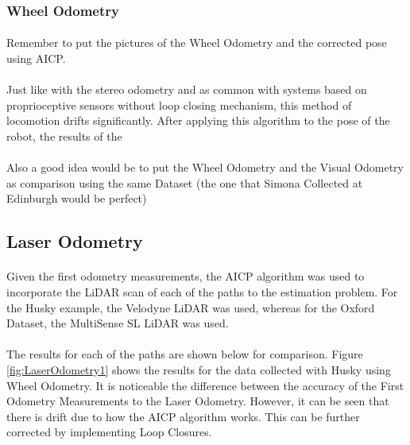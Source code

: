 \documentclass[11pt]{article}
\begin{document}
	\subsubsection*{Wheel Odometry}
	\paragraph{}
	Remember to put the pictures of the Wheel Odometry and the corrected pose using AICP.
	
	\paragraph{}
	Just like with the stereo odometry and as common with systems based on proprioceptive sensors without loop closing mechanism, this method of locomotion drifts significantly. After applying this algorithm to the pose of the robot, the results of the 
	\paragraph{}
	Also a good idea would be to put the Wheel Odometry and the Visual Odometry as comparison using the same Dataset (the one that Simona Collected at Edinburgh would be perfect)
		
	\subsection{Laser Odometry}
	\paragraph{}
	Given the first odometry measurements, the AICP algorithm was used to incorporate the LiDAR scan of each of the paths to the estimation problem. For the Husky example, the Velodyne \cite{velodyne} LiDAR was used, whereas for the Oxford Dataset, the MultiSense SL LiDAR was used.
	
	\paragraph{}
	The results for each of the paths are shown below for comparison. Figure \ref{fig:LaserOdometry1} shows the results for the data collected with Husky using Wheel Odometry. It is noticeable the difference between the accuracy of the First Odometry Measurements to the Laser Odometry. However, it can be seen that there is drift due to how the AICP algorithm works. This can be further corrected by implementing Loop Closures.
	
\end{document}
